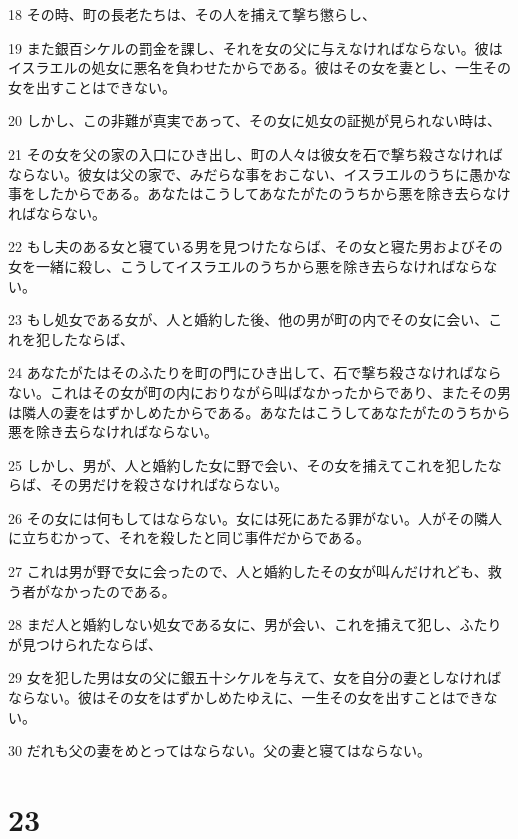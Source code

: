 \par 18 その時、町の長老たちは、その人を捕えて撃ち懲らし、
\par 19 また銀百シケルの罰金を課し、それを女の父に与えなければならない。彼はイスラエルの処女に悪名を負わせたからである。彼はその女を妻とし、一生その女を出すことはできない。
\par 20 しかし、この非難が真実であって、その女に処女の証拠が見られない時は、
\par 21 その女を父の家の入口にひき出し、町の人々は彼女を石で撃ち殺さなければならない。彼女は父の家で、みだらな事をおこない、イスラエルのうちに愚かな事をしたからである。あなたはこうしてあなたがたのうちから悪を除き去らなければならない。
\par 22 もし夫のある女と寝ている男を見つけたならば、その女と寝た男およびその女を一緒に殺し、こうしてイスラエルのうちから悪を除き去らなければならない。
\par 23 もし処女である女が、人と婚約した後、他の男が町の内でその女に会い、これを犯したならば、
\par 24 あなたがたはそのふたりを町の門にひき出して、石で撃ち殺さなければならない。これはその女が町の内におりながら叫ばなかったからであり、またその男は隣人の妻をはずかしめたからである。あなたはこうしてあなたがたのうちから悪を除き去らなければならない。
\par 25 しかし、男が、人と婚約した女に野で会い、その女を捕えてこれを犯したならば、その男だけを殺さなければならない。
\par 26 その女には何もしてはならない。女には死にあたる罪がない。人がその隣人に立ちむかって、それを殺したと同じ事件だからである。
\par 27 これは男が野で女に会ったので、人と婚約したその女が叫んだけれども、救う者がなかったのである。
\par 28 まだ人と婚約しない処女である女に、男が会い、これを捕えて犯し、ふたりが見つけられたならば、
\par 29 女を犯した男は女の父に銀五十シケルを与えて、女を自分の妻としなければならない。彼はその女をはずかしめたゆえに、一生その女を出すことはできない。
\par 30 だれも父の妻をめとってはならない。父の妻と寝てはならない。

\chapter{23}

